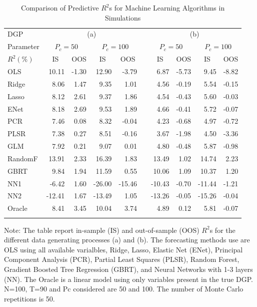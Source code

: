 \documentclass[11pt]{article}
\begin{document}
\begin{table}[ht]
\begin{threeparttable}
\centering
\setlength{\tabcolsep}{12pt}
\caption{Comparison of Predictive $R^2$s for Machine Learning Algorithms in Simulations}
\begin{tabular}{lrrrrcrrrr}
DGP & \multicolumn{4}{c}{(a)} && \multicolumn{4}{c}{(b)} \\
  \Xhline{2\arrayrulewidth}\noalign{\smallskip}
Parameter & \multicolumn{2}{c}{$P_c = 50$} & \multicolumn{2}{c}{$P_c = 100$}& & \multicolumn{2}{c}{$P_c = 50$} &  \multicolumn{2}{c}{$P_c = 100$} \\
  \noalign{\smallskip}\hline\noalign{\smallskip}
$R^2(\%)$ & \multicolumn{1}{c}{IS} & \multicolumn{1}{c}{OOS} & \multicolumn{1}{c}{IS} & \multicolumn{1}{c}{OOS} & &\multicolumn{1}{c}{IS} & \multicolumn{1}{c}{OOS} & \multicolumn{1}{c}{IS} & \multicolumn{1}{c}{OOS} \\ 
  \noalign{\smallskip}\hline\noalign{\smallskip}
OLS & 10.11 & -1.30 & 12.90 & -3.79 && 6.87 & -5.73 & 9.45 & -8.82 \\ 
Ridge & 8.06 & 1.47 & 9.35 & 1.01 && 4.56 & -0.19 & 5.54 & -0.15 \\ 
Lasso & 8.12 & 2.61 & 9.37 & 1.86 && 4.54 & -0.43 & 5.60 & -0.03 \\ 
ENet & 8.18 & 2.69 & 9.53 & 1.89 && 4.66 & -0.41 & 5.72 & -0.07 \\ 
PCR & 7.46 & 0.08 & 8.32 & -0.04 && 4.23 & -0.68 & 4.97 & -0.72 \\ 
PLSR & 7.38 & 0.27 & 8.51 & -0.16 && 3.67 & -1.98 & 4.50 & -3.36 \\ 
GLM & 7.92 & 0.21 & 9.07 & 0.01 && 4.80 & -0.48 & 5.87 & -0.98 \\ 
RandomF & 13.91 & 2.33 & 16.39 & 1.83 && 13.49 & 1.02 & 14.74 & 2.23 \\ 
GBRT & 9.84 & 1.94 & 11.59 & 0.55 && 10.06 & 1.09 & 10.37 & 1.20 \\ 
NN1 & -6.42 & 1.60 & -26.00 & -15.46 && -10.43 & -0.70 & -11.44 & -1.21 \\ 
NN2 & -12.41 & 1.67 & -13.49 & 1.05 && -13.26 & -0.05 & -15.26 & -0.04 \\ 
Oracle & 8.41 & 3.45 & 10.04 & 3.74 && 4.89 & 0.12 & 5.81 & -0.07 \\ 
   \Xhline{2\arrayrulewidth}
\end{tabular}
\begin{tablenotes}
      \small
      \item Note: The table report in-sample (IS) and out-of-sample (OOS) $R^2$s for the different data generating processes (a) and (b). The forecasting methods use are OLS using all available varialbles, Ridge, Lasso, Elastic Net (ENet), Principal Component Analysis (PCR), Partial Least Squares (PLSR), Random Forest, Gradient Boosted Tree Regression (GBRT), and Neural Networks with 1-3 layers (NN). The Oracle is a linear model using only variables present in the true DGP. N=100, T=90 and Pc considered are 50 and 100. The number of Monte Carlo repetitions is 50.
    \end{tablenotes}
  \end{threeparttable}
\label{table:simulation}
\end{table}
\end{document}
